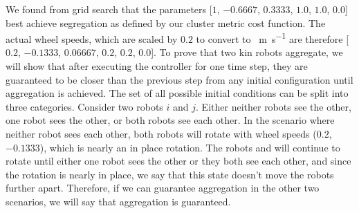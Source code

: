 \documentclass[conference]{IEEEtran}
\begin{document}
    We found from grid search that the parameters [$1$, $-0.6667$, $0.3333$, $1.0$, $1.0$, $0.0$] best achieve segregation as defined by our cluster metric cost function. The actual wheel speeds, which are scaled by $0.2$ to convert to \SI{}{\meter\per\second} are therefore [$0.2$, $-0.1333$, $0.06667$, $0.2$, $0.2$, $0.0$]. To prove that two kin robots aggregate, we will show that after executing the controller for one time step, they are guaranteed to be closer than the previous step from any initial configuration until aggregation is achieved. The set of all possible initial conditions can be split into three categories. Consider two robots $i$ and $j$. Either neither robots see the other, one robot sees the other, or both robots see each other. In the scenario where neither robot sees each other, both robots will rotate with wheel speeds ($0.2$,$-0.1333$), which is nearly an in place rotation. The robots and will continue to rotate until either one robot sees the other or they both see each other, and since the rotation is nearly in place, we say that this state doesn't move the robots further apart. Therefore, if we can guarantee aggregation in the other two scenarios, we will say that aggregation is guaranteed.
\end{document}

